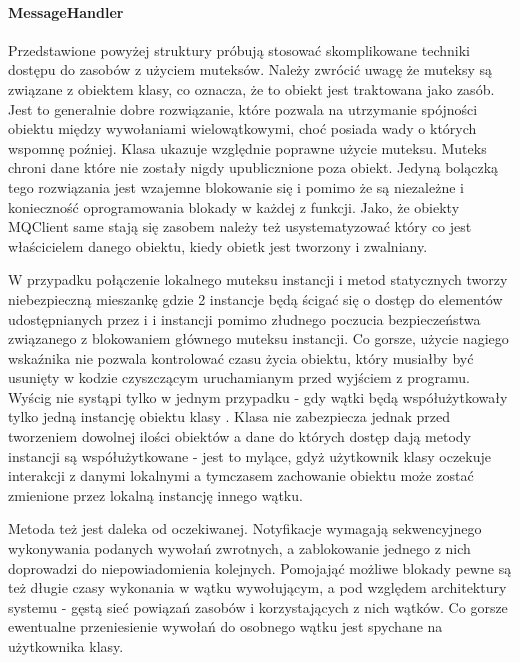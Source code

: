 \paragraph{MessageHandler}
Przedstawione powyżej struktury próbują stosować skomplikowane techniki dostępu do zasobów z użyciem muteksów. Należy zwrócić uwagę że muteksy są związane z obiektem klasy, co oznacza, że to obiekt jest traktowana jako zasób. Jest to generalnie dobre rozwiązanie, które pozwala na utrzymanie spójności obiektu między wywołaniami wielowątkowymi, choć posiada wady o których wspomnę poźniej.
Klasa  ukazuje względnie poprawne użycie muteksu. Muteks chroni dane które nie zostały nigdy upublicznione poza obiekt. Jedyną bolączką tego rozwiązania jest wzajemne blokowanie się  i  pomimo że są niezależne i konieczność oprogramowania blokady w każdej z funkcji. Jako, że obiekty MQClient same stają się zasobem należy też usystematyzować który co jest właścicielem danego obiektu, kiedy obietk jest tworzony i zwalniany.

W przypadku  połączenie lokalnego muteksu instancji i metod statycznych tworzy niebezpieczną mieszankę gdzie 2 instancje będą ścigać się o dostęp do elementów udostępnianych przez  i  i instancji  pomimo złudnego poczucia bezpieczeństwa związanego z blokowaniem głównego muteksu instancji. Co gorsze, użycie nagiego wskaźnika  nie pozwala kontrolować czasu życia obiektu, który musiałby być usunięty w kodzie czyszczącym uruchamianym przed wyjściem z programu. Wyścig nie systąpi tylko w jednym przypadku - gdy wątki będą współużytkowały tylko jedną instancję obiektu klasy . Klasa nie zabezpiecza jednak przed tworzeniem dowolnej ilości obiektów a dane do których dostęp dają metody instancji są współużytkowane - jest to mylące, gdyż użytkownik klasy oczekuje interakcji z danymi lokalnymi a tymczasem zachowanie obiektu może zostać zmienione przez lokalną instancję  innego wątku.

Metoda  też jest daleka od oczekiwanej. Notyfikacje wymagają sekwencyjnego wykonywania podanych wywołań zwrotnych, a zablokowanie jednego z nich doprowadzi do niepowiadomienia kolejnych. Pomojająć możliwe blokady pewne są też długie czasy wykonania w wątku wywołującym, a pod względem architektury systemu - gęstą sieć powiązań zasobów i korzystających z nich wątków. Co gorsze ewentualne przeniesienie wywołań do osobnego wątku jest spychane na użytkownika klasy.

